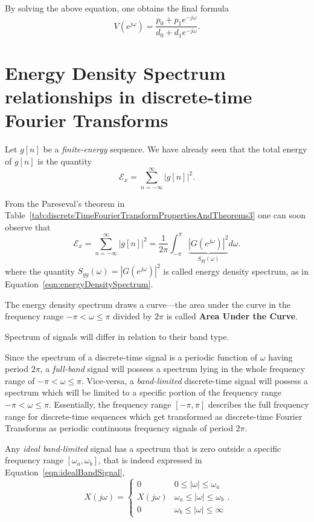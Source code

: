\documentclass[\documentfontsize, twocolumn]{\classname}
\begin{document}
By solving the above equation, one obtains the final formula
\[
    V(e^{j\omega}) = \frac{p_0 + p_1 e^{-j\omega}}{d_0 + d_1e^{-j\omega}}.
\]

\clearpage

\section{Energy Density Spectrum relationships in discrete-time Fourier Transforms}

Let $g[n]$ be a \emph{finite-energy} sequence. We have already seen that the total energy of $g[n]$ is the quantity
\[
    \mathcal E_x = \sum_{n=-\infty}^\infty | g[n]|^2.
\]

From the Pareseval's theorem in Table~\ref{tab:discreteTimeFourierTransformPropertiesAndTheorems3} one can soon observe that
\begin{equation}\label{eqn:energyDensitySpectrumParseval}
    \mathcal E_x = \sum_{n=-\infty}^\infty | g[n]|^2 = \frac 1{2\pi} \int_{-\pi}^\pi \underbrace{\left|G(e^{j\omega})\right|^2}_{S_{gg}(\omega)} d\omega.
\end{equation}
where the quantity $S_{gg}(\omega) = \left|G(e^{j\omega})\right|^2$ is called energy density spectrum, as in Equation~\ref{eqn:energyDensitySpectrum}.

The energy density spectrum draws a curve---the area under the curve in the frequency range $-\pi < \omega \leq \pi$ divided by $2\pi$ is called \textbf{Area Under the Curve}.

Spectrum of signals will differ in relation to their band type.

Since the spectrum of a discrete-time signal is a periodic function of $\omega$ having period $2\pi$, a \emph{full-band} signal will possess a spectrum lying in the whole frequency range of $-\pi < \omega \leq \pi$. Vice-versa, a \emph{band-limited} discrete-time signal will possess a spectrum which will be limited to a specific portion of the frequency range $-\pi < \omega \leq \pi$. Essentially, the frequency range $[-\pi, \pi]$ describes the full frequency range for discrete-time sequences which get transformed as discrete-time Fourier Transforms as periodic continuous frequency signals of period $2\pi$.

Any \emph{ideal band-limited} signal has a spectrum that is zero outside a specific frequency range $[\omega_a, \omega_b]$, that is indeed expressed in Equation~\ref{eqn:idealBandSignal},
\[
    X(j\omega) = \left\{\begin{array}{ll}
        0  &   0 \leq |\omega| \leq \omega_a\\
        X(j\omega)  &   \omega_a \leq |\omega| \leq \omega_b\\
        0  &   \omega_b \leq |\omega| \leq \infty
    \end{array}\right..
\]
\end{document}
